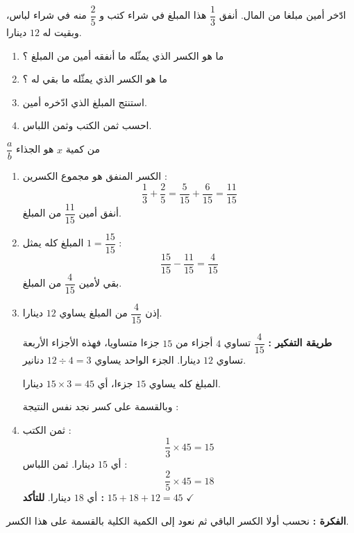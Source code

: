 \documentclass[12pt,a4paper]{article}
\begin{document}
\begin{corr}[title={تركيب: ميزانية أمين}, stars=3, source={Axiomaths}]
ادّخر أمين مبلغا من المال. أنفق $\dfrac{1}{3}$ هذا المبلغ في شراء كتب و $\dfrac{2}{5}$ منه في شراء لباس، وبقيت له $12$ دينارا.
\begin{enumerate}
  \item ما هو الكسر الذي يمثّله ما أنفقه أمين من المبلغ ؟
  \item ما هو الكسر الذي يمثّله ما بقي له ؟
  \item استنتج المبلغ الذي ادّخره أمين.
  \item احسب ثمن الكتب وثمن اللباس.
\end{enumerate}
\axsol
\begin{prop}
$\dfrac{a}{b}$ من كمية $x$ هو الجذاء 
\end{prop}
\begin{enumerate}[itemsep=14pt]
  \item الكسر المنفق هو مجموع الكسرين :
  \[\dfrac{1}{3}+\dfrac{2}{5}=\dfrac{5}{15}+\dfrac{6}{15}=\dfrac{11}{15}\]
  أنفق أمين $\dfrac{11}{15}$ من المبلغ.
  \item المبلغ كله يمثل $1=\dfrac{15}{15}$ :
  \[\dfrac{15}{15}-\dfrac{11}{15}=\dfrac{4}{15}\]
  بقي لأمين $\dfrac{4}{15}$ من المبلغ.
  \item إذن $\dfrac{4}{15}$ من المبلغ يساوي $12$ دينارا.

  \textbf{طريقة التفكير :} $\dfrac{4}{15}$ تساوي $4$ أجزاء من $15$ جزءا متساويا، فهذه الأجزاء الأربعة تساوي $12$ دينارا.
  الجزء الواحد يساوي $12\div4=3$ دنانير.

  المبلغ كله يساوي $15$ جزءا، أي $15\times3=45$ دينارا.

  وبالقسمة على كسر نجد نفس النتيجة : 
  \item ثمن الكتب :
  \[\dfrac{1}{3}\times45=15\]
  أي $15$ دينارا. ثمن اللباس :
  \[\dfrac{2}{5}\times45=18\]
  أي $18$ دينارا.
  \textbf{للتأكد :} $15+18+12=45$ $\checkmark$
\end{enumerate}
\textbf{الفكرة :} نحسب أولا الكسر الباقي ثم نعود إلى الكمية الكلية بالقسمة على هذا الكسر.
\end{corr}
\end{document}
